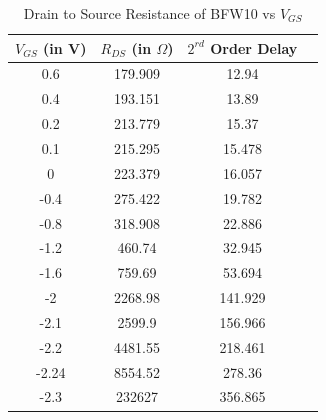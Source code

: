 \documentclass[10pt, conference]{IEEEtran}
\begin{document}
\begin{table}[H]
    \centering
    \caption{Drain to Source Resistance of BFW10 vs $V_{GS}$}
\begin{tabular}{|c|c|c|c|}
\hline
$V_{GS}$ (in V) & $R_{DS}$ (in $\Omega$) &  $2^{rd}$ Order Delay \\
\hline
0.6 & 179.909 & 12.94 \\
0.4 & 193.151 & 13.89 \\
0.2 & 213.779 & 15.37 \\
0.1 & 215.295 & 15.478 \\
0 & 223.379 & 16.057 \\
-0.4 & 275.422 & 19.782 \\
-0.8 & 318.908 & 22.886 \\
-1.2 & 460.74 & 32.945 \\
-1.6 & 759.69 & 53.694 \\
-2 & 2268.98 & 141.929 \\
-2.1 & 2599.9 & 156.966 \\
-2.2 & 4481.55 & 218.461 \\
-2.24 & 8554.52 & 278.36 \\
-2.3 & 232627 & 356.865 \\
\hline
\end{tabular}
    \label{tab:Rds_vs_Vgs}
\end{table}
\end{document}
